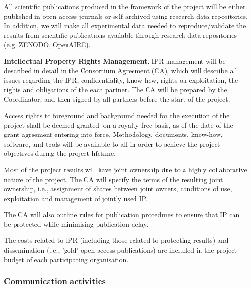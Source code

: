 All scientific publications produced in the framework of the project will be either published in open access journals or self-archived using research data repositories. In addition, we will make all experimental data needed to reproduce/validate the results from scientific publications available through research data repositories (e.g. ZENODO, OpenAIRE). 

{\bf Intellectual Property Rights Management.} IPR management will be described in detail in the Consortium Agreement (CA), which will describe all issues regarding the IPR, confidentiality, know-how, rights on exploitation, the rights and obligations of the each partner. The CA will be prepared by the Coordinator, and then signed by all partners before the start of the project. 

Access rights to foreground and background needed for the execution of the project shall be deemed granted, on a royalty-free basis, as of the date of the grant agreement entering into force. Methodology, documents, know-how, software, and tools will be available to all in order to achieve the project objectives during the project lifetime. 

Most of the project results will have joint ownership due to a highly collaborative nature of the project. The CA will specify the terms of the resulting joint ownership, i.e., assignment of shares between joint owners, conditions of use, exploitation and management of jointly used IP. 

The CA will also outline rules for publication procedures to ensure that IP can be protected while minimising publication delay.

The costs related to IPR (including those related to protecting results) and dissemination (i.e., 'gold' open access publications) are included in the project budget of each participating organisation. 

\subsubsection{Communication activities}
\label{subsubsect:communication}


